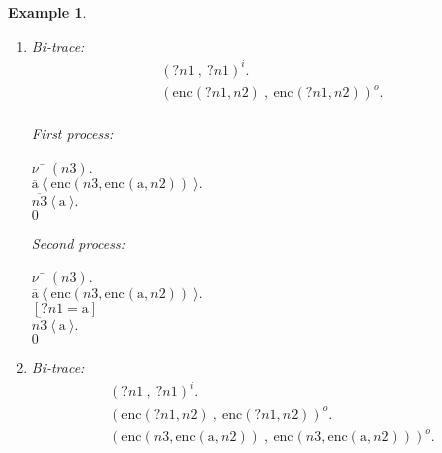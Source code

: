 \documentclass{article}
\newenvironment{example}{\begin{exa} \rm}{\end{exa}}
\newtheorem{exa}[theorem]{Example}
\begin{document}
\begin{example}
\begin{enumerate}
First process: 
\begin{tabbing}$\nu$ \= $(n2).$ \\ 
$\overline{{\mathrm{a}}}~\langle ~\mbox{enc}(?n1,n2) ~ \rangle.$ \\ 
$\nu$ \= $(n3).$ \\ 
$\overline{{\mathrm{a}}}~\langle ~\mbox{enc}(n3,\mbox{enc}({\mathrm{a}},n2)) ~ \rangle.$ \\ 
$\overline{n3}~\langle ~{\mathrm{a}} ~ \rangle.$ \\ 
$0$ \\ 
\end{tabbing}
Second process: 
\begin{tabbing}$\nu$ \= $(n2).$ \\ 
$\overline{{\mathrm{a}}}~\langle ~\mbox{enc}(?n1,n2) ~ \rangle.$ \\ 
$\nu$ \= $(n3).$ \\ 
$\overline{{\mathrm{a}}}~\langle ~\mbox{enc}(n3,\mbox{enc}({\mathrm{a}},n2)) ~ \rangle.$ \\ 
${[?n1 = {\mathrm{a}} ]}$ \\ 
$\overline{n3}~\langle ~{\mathrm{a}} ~ \rangle.$ \\ 
$0$ \\ 
\end{tabbing}
\item 
Bi-trace: 
$$
\begin{array}{l}
(?n1~ , ~ ?n1)^i. \\ 
(\mbox{enc}(?n1,n2)~ , ~ \mbox{enc}(?n1,n2))^o. \\ 
\end{array}
$$



First process: 
\begin{tabbing}$\nu$ \= $(n3).$ \\ 
$\overline{{\mathrm{a}}}~\langle ~\mbox{enc}(n3,\mbox{enc}({\mathrm{a}},n2)) ~ \rangle.$ \\ 
$\overline{n3}~\langle ~{\mathrm{a}} ~ \rangle.$ \\ 
$0$ \\ 
\end{tabbing}
Second process: 
\begin{tabbing}$\nu$ \= $(n3).$ \\ 
$\overline{{\mathrm{a}}}~\langle ~\mbox{enc}(n3,\mbox{enc}({\mathrm{a}},n2)) ~ \rangle.$ \\ 
${[?n1 = {\mathrm{a}} ]}$ \\ 
$\overline{n3}~\langle ~{\mathrm{a}} ~ \rangle.$ \\ 
$0$ \\ 
\end{tabbing}
\item 
Bi-trace: 
$$
\begin{array}{l}
(?n1~ , ~ ?n1)^i. \\ 
(\mbox{enc}(?n1,n2)~ , ~ \mbox{enc}(?n1,n2))^o. \\ 
(\mbox{enc}(n3,\mbox{enc}({\mathrm{a}},n2))~ , ~ \mbox{enc}(n3,\mbox{enc}({\mathrm{a}},n2)))^o. \\ 
\end{array}
$$




\end{enumerate}
\end{example}
\end{document}
